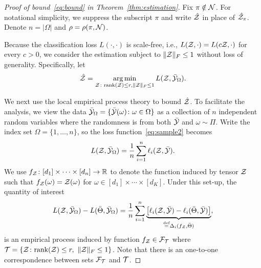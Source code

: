 \documentclass[twoside,11pt]{article}
\theoremstyle{definition}
\newcommand*{\KeepStyleUnderBrace}[1]{%
  \mathop{%
    \mathchoice
    {\underbrace{\displaystyle#1}}%
    {\underbrace{\textstyle#1}}%
    {\underbrace{\scriptstyle#1}}%
    {\underbrace{\scriptscriptstyle#1}}%
  }\limits
}
\def\rank{\textup{rank}}
\begin{document}
\begin{proof}[Proof of bound~\eqref{eq:bound} in Theorem~\ref{thm:estimation}]
Fix $\pi\notin\mathcal{N}$. For notational simplicity, we suppress the subscript $\pi$ and write $\hat {\mathcal{Z}}$ in place of $\hat {\mathcal{Z}}_\pi$. Denote $n=|\Omega|$ and $\rho=\rho(\pi, \mathcal{N})$. 

Because the classification loss $L(\cdot, \cdot)$ is scale-free, i.e., $L(\mathcal{Z},\cdot)=L(c\mathcal{Z}, \cdot)$ for every $c>0$, we consider the estimation subject to $\lVert\mathcal{Z}\rVert_F\leq 1$ without loss of generality. Specifically, let
\begin{align}\label{eq:opt}
\hat {\mathcal{Z}}=\operatorname*{arg\,min}_{\mathcal{Z}\colon \textup{rank}(\mathcal{Z})\leq r, \lVert\mathcal{Z}\rVert_F\leq 1}L(\mathcal{Z}, \bar {\mathcal{Y}}_{\Omega}).
\end{align}

We next use the local empirical process theory to bound $\hat {\mathcal{Z}}$. To facilitate the analysis, we view the data $\bar {\mathcal{Y}}_\Omega=\{\bar {\mathcal{Y}}(\omega)\colon \omega\in \Omega\}$ as a collection of $n$ independent random variables where the randomness is from both $\bar {\mathcal{Y}}$ and $\omega\sim\Pi$. Write the index set $\Omega=\{1,\ldots,n\}$, so the loss function~\eqref{eq:sample2} becomes
\[
L(\mathcal{Z},\bar {\mathcal{Y}}_\Omega)={1\over n}\sum_{i=1}^n\ell_{i}(\mathcal{Z}, \bar {\mathcal{Y}}).
\]
We use $f_{\mathcal{Z}} \colon [d_1]\times\cdots\times[d_n] \to \mathbb{R}$ to denote the function induced by tensor $\mathcal{Z}$ such that $f_{\mathcal{Z}}(\omega)=\mathcal{Z}(\omega)$ for $\omega\in[d_1]\times \cdots \times [d_K]$. Under this set-up, the quantity of interest
\begin{align}\label{eq:empirical}
 L(\tZ,\bar \tY_\Omega)-L(\bar \Theta,\bar \tY_\Omega)={1\over n}\sum_{i=1}^n \KeepStyleUnderBrace{\left[\ell_{i}(\tZ, \bar \tY)-\ell_{i}(\bar \Theta, \bar \tY)\right]}_{\stackrel{\text{def}}{=}\Delta_i(f_\tZ,\bar \Theta)},
\end{align}
is an empirical process induced by function $f_{\mathcal{Z}}\in \mathcal{F}_{\mathcal{T}}$ where $\tT=\{\tZ\colon \rank(\tZ)\leq r, \ \FnormSize{}{\tZ}\leq 1\}$. Note that there is an one-to-one correspondence between sets $\mathcal{F}_{\mathcal{T}}$ and $\mathcal{T}$. 


\end{proof}
\end{document}
